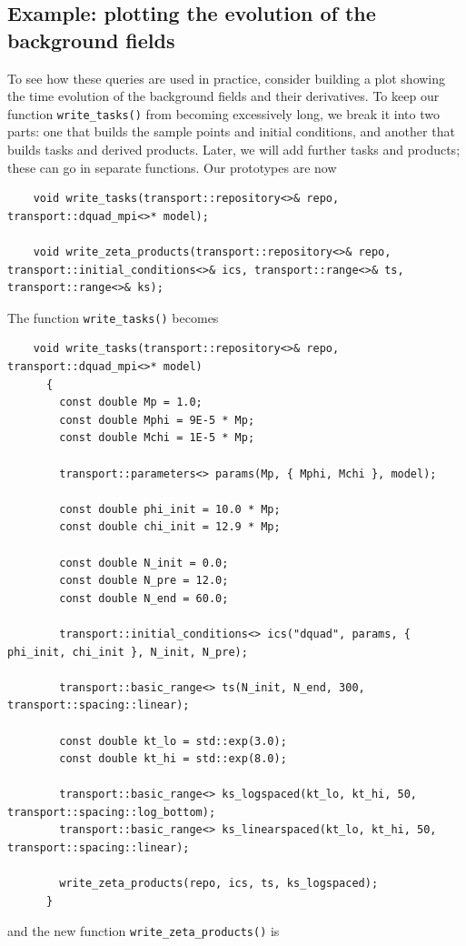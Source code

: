 \documentclass[11pt,a4paper]{article}
\begin{document}
\subsection{Example: plotting the evolution of the background fields}
\label{sec:example-backg-evolve}
To see how these queries are used in practice,
consider building a plot showing the time evolution of the background
fields and their derivatives.
To keep our function
\texttt{write_tasks()} from becoming excessively long, we break it
into two parts: one that builds the sample points and initial conditions,
and another that builds tasks and derived products.
Later, we will add further tasks and products; these can go in separate functions.
Our prototypes are now
\begin{verbatim}
	void write_tasks(transport::repository<>& repo, transport::dquad_mpi<>* model);
	
	void write_zeta_products(transport::repository<>& repo, transport::initial_conditions<>& ics, transport::range<>& ts, transport::range<>& ks);	
\end{verbatim}
The function \texttt{write_tasks()} becomes
\begin{verbatim}
	void write_tasks(transport::repository<>& repo, transport::dquad_mpi<>* model)
	  {
	    const double Mp = 1.0;
	    const double Mphi = 9E-5 * Mp;
	    const double Mchi = 1E-5 * Mp;
	
	    transport::parameters<> params(Mp, { Mphi, Mchi }, model);
	
	    const double phi_init = 10.0 * Mp;
	    const double chi_init = 12.9 * Mp;
	
	    const double N_init = 0.0;
	    const double N_pre = 12.0;
	    const double N_end = 60.0;
	
	    transport::initial_conditions<> ics("dquad", params, { phi_init, chi_init }, N_init, N_pre);
	
	    transport::basic_range<> ts(N_init, N_end, 300, transport::spacing::linear);
	
	    const double kt_lo = std::exp(3.0);
	    const double kt_hi = std::exp(8.0);
	
	    transport::basic_range<> ks_logspaced(kt_lo, kt_hi, 50, transport::spacing::log_bottom);
	    transport::basic_range<> ks_linearspaced(kt_lo, kt_hi, 50, transport::spacing::linear);
	
	    write_zeta_products(repo, ics, ts, ks_logspaced);
	  }
\end{verbatim}
and the new function
\texttt{write_zeta_products()} is
\end{document}
